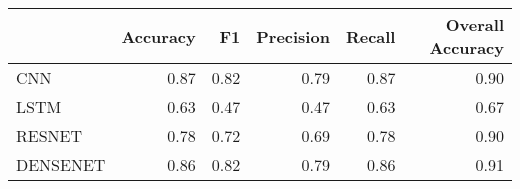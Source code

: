 \begin{tabular}{lrrrrr}
\toprule
{} &  Accuracy &    F1 &  Precision &  Recall &  Overall Accuracy \\
\midrule
CNN      &      0.87 &  0.82 &       0.79 &    0.87 &              0.90 \\
LSTM     &      0.63 &  0.47 &       0.47 &    0.63 &              0.67 \\
RESNET   &      0.78 &  0.72 &       0.69 &    0.78 &              0.90 \\
DENSENET &      0.86 &  0.82 &       0.79 &    0.86 &              0.91 \\
\bottomrule
\end{tabular}
